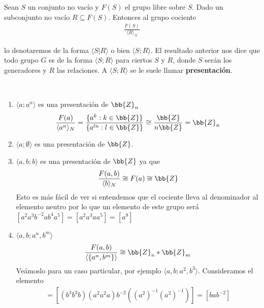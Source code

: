 \begin{definicion}
    Sean $S$ un conjunto no vacío y $F(S)$ el grupo libre sobre $S$. Dado un subconjunto no vacío $R\subseteq F(S)$. Entonces al grupo cociente
    \begin{gather*}
        \frac{F(S)}{\langle R \rangle_N}
    \end{gather*}
        
    lo denotaremos de la forma $\langle S | R \rangle$ o bien $\langle S;R \rangle$. El resultado anterior nos dice que todo grupo $G$ es de la forma $\langle S;R\rangle$ para ciertos $S$ y $R$, donde $S$ serán los generadores y $R$ las relaciones. A $\langle S;R \rangle$ se le suele llamar \textbf{presentación}.
\end{definicion}

\begin{ejemplo}\
    \begin{enumerate}
        \item $\langle a; a^n \rangle$ es una presentación de $\bb{Z}_n$
        \begin{gather*}
            \frac{F(a)}{\langle a^n \rangle_N} = \frac{\{a^k : k\in \bb{Z}\}}{\{a^{ln} : l\in \bb{Z}\}} \cong \frac{\bb{Z}}{n\bb{Z}} = \bb{Z}_n
        \end{gather*}

        \item $\langle a; \emptyset \rangle$ es una presentación de $\bb{Z}$.
        \item $\langle a,b ; b\rangle$ es una presentación de $\bb{Z}$ ya que
        \begin{gather*}
            \frac{F(a,b)}{\langle b \rangle_N} \cong F(a) \cong \bb{Z}
        \end{gather*}
        Esto es más fácil de ver si entendemos que el cociente lleva al denominador al elemento neutro por lo que un elemento de este grupo será $[a^2a^3b^{-2} a b^{4} a^5] = [a^2a^3a a^5] = [a^9]$

        \item $\langle a,b;a^n,b^m \rangle$
        \begin{gather*}
            \frac{F(a,b)}{\langle \{a^n, b^m\} \rangle} \cong \bb{Z}_n \ast \bb{Z}_m
        \end{gather*}
        Veámoslo para un caso particular, por ejemplo $\langle a, b; a^2,b^3\rangle$. Consideramos el elemento
        \begin{gather*}
            [b^7a^5b^{-2}a^{-4}] =[ (b^3b^3b)(a^2a^2a)b^{-2}((a^2)^{-1}(a^2)^{-1})] =[bab^{-2}]
        \end{gather*}


\end{enumerate}
\end{ejemplo}

